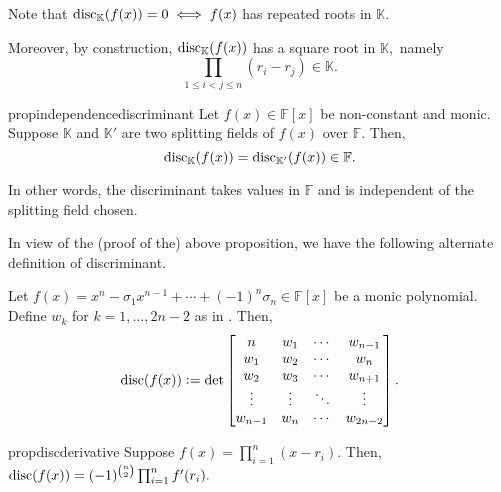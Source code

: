 \begin{rem} \label{rem:discrepeatedroots}
    Note that $\operatorname{disc}_{\mathbb{K}}(f(x)) = 0 \iff f(x)$ has repeated roots in $\mathbb{K}.$

    Moreover, by construction, $\operatorname{disc}_{\mathbb{K}}(f(x))$ has a square root in $\mathbb{K},$ namely
    \begin{equation*} 
        \prod_{1 \le i < j \le n} (r_i - r_j) \in \mathbb{K}.
    \end{equation*}
\end{rem}

\begin{restatable}[]{prop}{independencediscriminant}
\label{prop:independencediscriminant}
    Let $f(x) \in \mathbb{F}[x]$ be non-constant and monic. Suppose $\mathbb{K}$ and $\mathbb{K}'$ are two splitting fields of $f(x)$ over $\mathbb{F}.$ Then,
    \begin{equation*} 
        \operatorname{disc}_{\mathbb{K}}(f(x)) = \operatorname{disc}_{\mathbb{K}'}(f(x)) \in \mathbb{F}.
    \end{equation*} 

    In other words, the discriminant takes values in $\mathbb{F}$ and is independent of the splitting field chosen. \hfill\hyperref[prop:independencediscriminant2]{\downsym}
\end{restatable}

In view of the (proof of the) above proposition, we have the following alternate definition of discriminant.

\begin{defn}%
    Let $f(x) = x^n - \sigma_1x^{n - 1} + \cdots + (-1)^n\sigma_n \in \mathbb{F}[x]$ be a monic polynomial. Define $w_k$ for $k = 1, \ldots, 2n - 2$ as in . Then, 
    \begin{equation*} 
        \operatorname{disc}(f(x)) \vcentcolon= \det \begin{bmatrix}
            n & w_1 & \cdots & w_{n - 1}\\
            w_1 & w_2 & \cdots & w_n\\
            w_2 & w_3 & \cdots & w_{n + 1}\\
            \vdots & \vdots & \ddots & \vdots \\
            w_{n - 1} & w_n & \cdots & w_{2n - 2}\\
        \end{bmatrix}.
    \end{equation*}
\end{defn}

\begin{restatable}{prop}{discderivative}
\label{prop:discderivative}
    Suppose $f(x) = \prod_{i = 1}^{n}(x - r_i).$ Then, $\operatorname{disc}(f(x)) = (-1)^{\binom{n}{2}}\prod_{i = 1}^{n}f'(r_i).$ \hfill\hyperref[prop:discderivative2]{\downsym}
\end{restatable}

